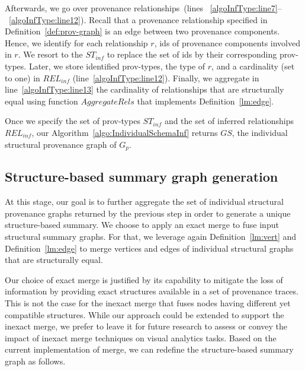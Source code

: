 Afterwards, we go over provenance relationships~(lines ~\ref{algoInfType:line7}--~\ref{algoInfType:line12}). 
Recall that a provenance relationship specified in Definition~\ref{def:prov-graph} is an edge between two provenance components.
Hence, we identify for each relationship $r$, ids of provenance components involved in $r$. We resort to the $ST_{inf}$ to replace the set of ids by their corresponding prov-types. 
Later, we store identified prov-types, the type of $r$, and a cardinality (set to one) in $REL_{inf}$ (line~\ref{algoInfType:line12}). 
Finally, we aggregate in line~\ref{algoInfType:line13} the cardinality of relationships that are structurally equal using function $AggregateRels$ that implements Definition~\ref{lm:edge}.

Once we specify the set of prov-types $ST_{inf}$ and the set of inferred relationships $REL_{inf}$, 
our Algorithm~\ref{algo:IndividualSchemaInf} returns $GS$, the individual structural provenance graph of $G_p$.





\subsection{Structure-based summary graph generation}
At this stage, our goal is to further aggregate the set of individual structural provenance graphs returned by the previous step in order to generate a unique structure-based summary.  We choose to apply an exact merge to fuse input structural summary graphs. 
For that, we leverage again Definition~\ref{lm:vert} and Definition~\ref{lm:edge} to merge  vertices and edges of individual structural graphs that are structurally equal. 


Our choice of exact merge is justified by its capability to mitigate the loss of information by providing exact structures available in a set of provenance traces. 
This is not the case for the inexact merge that fuses nodes having different yet compatible structures.
While our approach could be extended to support the inexact merge, we prefer to leave it for future research to assess or convey the impact of inexact merge techniques on visual analytics tasks. 
Based on the current implementation of merge,  we can redefine the structure-based summary graph as follows.



